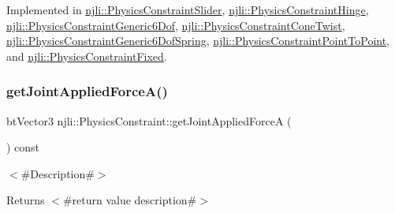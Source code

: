 Implemented in \mbox{\hyperlink{classnjli_1_1_physics_constraint_slider_aff5bac3b1c256860d6f8214d64ca8a61}{njli\+::\+Physics\+Constraint\+Slider}}, \mbox{\hyperlink{classnjli_1_1_physics_constraint_hinge_abc19706f99699a8af8178058c8d80822}{njli\+::\+Physics\+Constraint\+Hinge}}, \mbox{\hyperlink{classnjli_1_1_physics_constraint_generic6_dof_a55d44efd5fb9dcd1f983f3bb5f2ac6d5}{njli\+::\+Physics\+Constraint\+Generic6\+Dof}}, \mbox{\hyperlink{classnjli_1_1_physics_constraint_cone_twist_a51dfe168c4b70ea71ce210079394b22b}{njli\+::\+Physics\+Constraint\+Cone\+Twist}}, \mbox{\hyperlink{classnjli_1_1_physics_constraint_generic6_dof_spring_a072c17a336b74f574c9892e8ccf12278}{njli\+::\+Physics\+Constraint\+Generic6\+Dof\+Spring}}, \mbox{\hyperlink{classnjli_1_1_physics_constraint_point_to_point_a2ee05517ec402655c0953184dc7642b3}{njli\+::\+Physics\+Constraint\+Point\+To\+Point}}, and \mbox{\hyperlink{classnjli_1_1_physics_constraint_fixed_acd6e7d3872dc19e5bab285fddc2fb2f3}{njli\+::\+Physics\+Constraint\+Fixed}}.

\mbox{\label{classnjli_1_1_physics_constraint_a2a02805fa70d5ba764986a0678dacb57}} 
\subsubsection{\texorpdfstring{get\+Joint\+Applied\+Force\+A()}{getJointAppliedForceA()}}
{\footnotesize\ttfamily bt\+Vector3 njli\+::\+Physics\+Constraint\+::get\+Joint\+Applied\+ForceA (\begin{DoxyParamCaption}{ }\end{DoxyParamCaption}) const}

$<$\#\+Description\#$>$

\begin{DoxyReturn}{Returns}
$<$\#return value description\#$>$ 
\end{DoxyReturn}
\mbox{\label{classnjli_1_1_physics_constraint_a62b371d9914b2206441be949df162afb}} 

